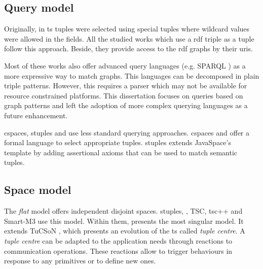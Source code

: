 


\subsection{Query model}

Originally, in \ac{ts} tuples were selected using special tuples where wildcard values were allowed in the fields. %
All the studied works which use a \ac{rdf} triple as a tuple follow this approach.
Beside, they provide access to the \ac{rdf} graphs by their \acp{uri}.

Most of these works also offer advanced query languages (e.g. SPARQL ) as a more expressive way to match graphs.
This languages can be decomposed in plain triple patterns.
However, this requires a parser which may not be available for resource constrained platforms.
This dissertation focuses on queries based on graph patterns and left the adoption of more complex querying languages as a future enhancement.

\ac{cspaces}, \ac{stuples} and \citeauthor{nardini_semantic_2013} use less standard querying approaches.
\ac{cspaces} \citep{martinrecuerda_towards_2005} and \citet{nardini_semantic_2013} offer a formal language to select appropriate tuples.
\ac{stuples}\citep{khushraj_stuples:_2004} extends JavaSpace's template by adding assertional axioms that can be used to match semantic tuples.




\subsection{Space model}
\label{sec:soa_tsc_space}

The \emph{flat} model offers independent disjoint spaces.
\ac{stuples}, \citet{nardini_semantic_2013}, TSC, tsc++ and Smart-M3 use this model.
Within them, \citet{nardini_semantic_2013} presents the most singular model.
It extends TuCSoN \cite{omicini_tucson:_1998}, which presents an evolution of the \ac{ts} called \emph{tuple centre}.
A \emph{tuple centre} can be adapted to the application needs through reactions to communication operations.
These reactions allow to trigger behaviours in response to any primitives or to define new ones.


